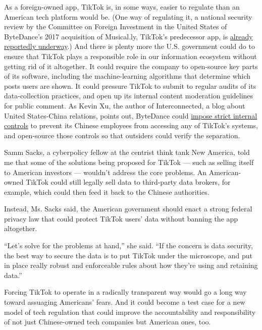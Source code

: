 As a foreign-owned app, TikTok is, in some ways, easier to regulate than
an American tech platform would be. (One way of regulating it, a
national security review by the Committee on Foreign Investment in the
United States of ByteDance's 2017 acquisition of Musical.ly, TikTok's
predecessor app, is
\href{https://www.reuters.com/article/us-tiktok-cfius-exclusive/exclusive-u-s-opens-national-security-investigation-into-tiktok-sources-idUSKBN1XB4IL}{already
reportedly underway}.) And there is plenty more the U.S. government
could do to ensure that TikTok plays a responsible role in our
information ecosystem without getting rid of it altogether. It could
require the company to open-source key parts of its software, including
the machine-learning algorithms that determine which posts users are
shown. It could pressure TikTok to submit to regular audits of its
data-collection practices, and open up its internal content moderation
guidelines for public comment. As Kevin Xu, the author of
Interconnected, a blog about United States-China relations, points out,
ByteDance could
\href{https://interconnected.blog/can-bytedance-build-trust/}{impose
strict internal controls} to prevent its Chinese employees from
accessing any of TikTok's systems, and open-source those controls so
that outsiders could verify the separation.

Samm Sacks, a cyberpolicy fellow at the centrist think tank New America,
told me that some of the solutions being proposed for TikTok --- such as
selling itself to American investors --- wouldn't address the core
problems. An American-owned TikTok could still legally sell data to
third-party data brokers, for example, which could then feed it back to
the Chinese authorities.

Instead, Ms. Sacks said, the American government should enact a strong
federal privacy law that could protect TikTok users' data without
banning the app altogether.

``Let's solve for the problems at hand,'' she said. ``If the concern is
data security, the best way to secure the data is to put TikTok under
the microscope, and put in place really robust and enforceable rules
about how they're using and retaining data.''

Forcing TikTok to operate in a radically transparent way would go a long
way toward assuaging Americans' fears. And it could become a test case
for a new model of tech regulation that could improve the accountability
and responsibility of not just Chinese-owned tech companies but American
ones, too.

